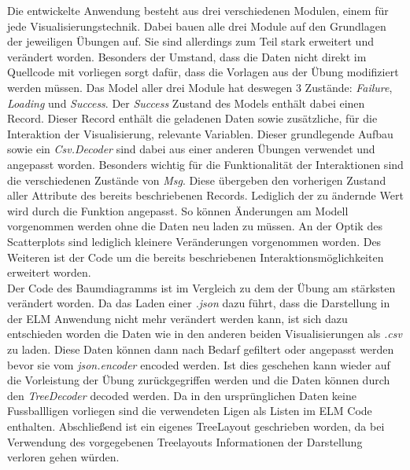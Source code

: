 \documentclass[usegeometry=true]{scrartcl}
\begin{document}
Die entwickelte Anwendung besteht aus drei verschiedenen Modulen, einem für jede Visualisierungstechnik. Dabei bauen alle drei Module auf den Grundlagen der jeweiligen Übungen auf. Sie sind allerdings zum Teil stark erweitert und verändert worden.
Besonders der Umstand, dass die Daten nicht direkt im Quellcode mit vorliegen sorgt dafür, dass die Vorlagen aus der Übung modifiziert werden müssen.
Das Model aller drei Module hat deswegen 3 Zustände: \textit{Failure}, \textit{Loading} und \textit{Success}. Der \textit{Success} Zustand des Models enthält dabei einen Record. Dieser Record enthält die geladenen Daten sowie zusätzliche, für die Interaktion der Visualisierung, relevante Variablen. Dieser grundlegende Aufbau sowie ein \textit{Csv.Decoder} sind dabei aus einer anderen Übungen verwendet und angepasst worden.
Besonders wichtig für die Funktionalität der Interaktionen sind die verschiedenen Zustände von \textit{Msg}. Diese übergeben den vorherigen Zustand aller Attribute des bereits beschriebenen Records. Lediglich der zu ändernde Wert wird durch die Funktion angepasst. So können Änderungen am Modell vorgenommen werden ohne die Daten neu laden zu müssen. An der Optik des Scatterplots sind lediglich kleinere Veränderungen vorgenommen worden. Des Weiteren ist der Code um die bereits beschriebenen Interaktionsmöglichkeiten erweitert worden.\\
Der Code des Baumdiagramms ist im Vergleich zu dem der Übung am stärksten verändert worden. Da das Laden einer \textit{.json} dazu führt, dass die Darstellung in der ELM Anwendung nicht mehr verändert werden kann, ist sich dazu entschieden worden die Daten wie in den anderen beiden Visualisierungen als \textit{.csv} zu laden. Diese Daten können dann nach Bedarf gefiltert oder angepasst werden bevor sie vom \textit{json.encoder} encoded werden. Ist dies geschehen kann wieder auf die Vorleistung der Übung zurückgegriffen werden und die Daten können durch den \textit{TreeDecoder} decoded werden. Da in den ursprünglichen Daten keine Fussballligen vorliegen sind die verwendeten Ligen als Listen im ELM Code enthalten. Abschließend ist ein eigenes TreeLayout geschrieben worden, da bei Verwendung des vorgegebenen Treelayouts Informationen der Darstellung verloren gehen würden.



\end{document}
